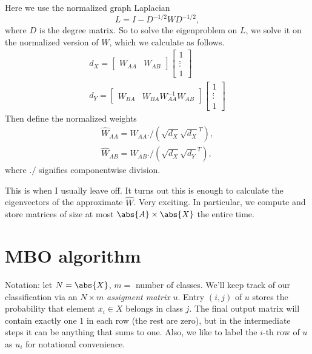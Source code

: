 \documentclass[12pt]{article}
\begin{document}
Here we use the normalized graph Laplacian
\[L = I - D^{-1/2}WD^{-1/2},\]
where $D$ is the degree matrix. So to solve the eigenproblem on $L$, we solve it on the normalized version of $W$, which we calculate as follows.
\begin{align}
  d_X = \begin{bmatrix}W_{AA} & W_{AB}\end{bmatrix}
  \begin{bmatrix}1 \\ \vdots \\ 1 \end{bmatrix} \\
  d_Y = \begin{bmatrix}W_{BA} & W_{BA}W_{AA}^{-1}W_{AB}\end{bmatrix}
  \begin{bmatrix}1 \\ \vdots \\ 1 \end{bmatrix}
\end{align}
Then define the normalized weights
\begin{align}
  \hat{W}_{AA} = W_{AA} ./ \left(\sqrt{d_X}\sqrt{d_X}^T\right),\\
  \hat{W}_{AB} = W_{AB} ./ \left(\sqrt{d_X}\sqrt{d_Y}^T\right),
\end{align}
where $./$ signifies componentwise division.

This is when I usually leave off. It turns out this is enough to calculate the eigenvectors of the approximate $\hat{W}$. Very exciting. In particular, we compute and store matrices of size at most $\abs{A}\times\abs{X}$ the entire time.

\section{MBO algorithm}
\cite{Meng17,Hu2015,Merkurjev13}
Notation: let $N = \abs{X}$, $m = $ number of classes. We'll keep track of our classification via an $N\times m$ \emph{assigment matrix} $u$. Entry $(i,j)$ of $u$ stores the probability that element $x_i \in X$ belongs in class $j$. The final output matrix will contain exactly one $1$ in each row (the rest are zero), but in the intermediate steps it can be anything that sums to one. Also, we like to label the $i$-th row of $u$ as $u_i$ for notational convenience.
\end{document}
